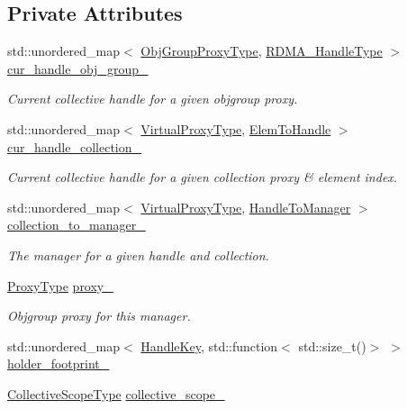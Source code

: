 \subsection*{Private Attributes}
\begin{DoxyCompactItemize}
\item 
std\+::unordered\+\_\+map$<$ \hyperlink{namespacevt_ad7cae989df485fccca57f0792a880a8e}{Obj\+Group\+Proxy\+Type}, \hyperlink{namespacevt_a10442579ec4e7ebef223818e64bcf908}{R\+D\+M\+A\+\_\+\+Handle\+Type} $>$ \hyperlink{structvt_1_1rdma_1_1_manager_a1aa2e20b7843cdc8efeddda319195113}{cur\+\_\+handle\+\_\+obj\+\_\+group\+\_\+}
\begin{DoxyCompactList}\small\item\em Current collective handle for a given objgroup proxy. \end{DoxyCompactList}\item 
std\+::unordered\+\_\+map$<$ \hyperlink{namespacevt_a1b417dd5d684f045bb58a0ede70045ac}{Virtual\+Proxy\+Type}, \hyperlink{structvt_1_1rdma_1_1_manager_ad794893058cec7595bc2bcb466ce7d3f}{Elem\+To\+Handle} $>$ \hyperlink{structvt_1_1rdma_1_1_manager_adde6a1913c6089be9439b5833489a66c}{cur\+\_\+handle\+\_\+collection\+\_\+}
\begin{DoxyCompactList}\small\item\em Current collective handle for a given collection proxy \& element index. \end{DoxyCompactList}\item 
std\+::unordered\+\_\+map$<$ \hyperlink{namespacevt_a1b417dd5d684f045bb58a0ede70045ac}{Virtual\+Proxy\+Type}, \hyperlink{structvt_1_1rdma_1_1_manager_aac6e7c58d320c302ea08461941d65f6e}{Handle\+To\+Manager} $>$ \hyperlink{structvt_1_1rdma_1_1_manager_ae579c90339a37d953a57dc942ff5f6d1}{collection\+\_\+to\+\_\+manager\+\_\+}
\begin{DoxyCompactList}\small\item\em The manager for a given handle and collection. \end{DoxyCompactList}\item 
\hyperlink{structvt_1_1rdma_1_1_manager_a75d5cdc6428ea19f5ec665b04dcd7166}{Proxy\+Type} \hyperlink{structvt_1_1rdma_1_1_manager_a033b59b7b1ecdf7e813d2999c03134cb}{proxy\+\_\+}
\begin{DoxyCompactList}\small\item\em Objgroup proxy for this manager. \end{DoxyCompactList}\item 
std\+::unordered\+\_\+map$<$ \hyperlink{structvt_1_1rdma_1_1_handle_key}{Handle\+Key}, std\+::function$<$ std\+::size\+\_\+t()$>$ $>$ \hyperlink{structvt_1_1rdma_1_1_manager_a7f037c941c0c8fc3d5b29b3d235bf280}{holder\+\_\+footprint\+\_\+}
\item 
\hyperlink{structvt_1_1rdma_1_1_manager_a7a5509b81547110f71aa85027520cfd5}{Collective\+Scope\+Type} \hyperlink{structvt_1_1rdma_1_1_manager_ad82ac94d4020fbdba45ee4bb8b69b7eb}{collective\+\_\+scope\+\_\+}
\end{DoxyCompactItemize}
